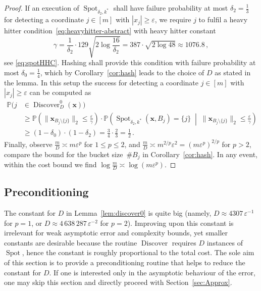 \documentclass[12pt]{article}
\theoremstyle{plain}
\theoremstyle{definition}
\renewcommand{\P}{{\mathbb P}}
\newcommand{\eps}{\varepsilon}
\renewcommand{\vec}{\boldsymbol}
\DeclareMathOperator{\spot}{Spot}
\DeclareMathOperator{\discover}{Discover} %
\begin{document}
\begin{proof}
    If an execution of $\spot_{\delta_2,k^\ast}$ 
    shall have failure probability at most $\delta_2 = \frac{1}{3}$ 
    for detecting a coordinate $j \in [m]$ with $|x_j| \geq \eps$,
    we require $j$ to fulfil a heavy hitter condition~\eqref{eq:heavyhitter-abstract}
    with heavy hitter constant
    \begin{equation*}
        \gamma = \frac{1}{\delta_2} \cdot 129 \sqrt{2 \log\frac{16}{\delta_2}}
            = 387 \cdot \sqrt{2 \log 48} \approx 1076.8 \,,
    \end{equation*}
    see \eqref{eq:spotHHC}.
    Hashing shall provide this condition with failure probability at most \mbox{$\delta_0 = \frac{1}{4}$},
    which by Corollary~\ref{cor:hash} leads to the choice of $D$ as stated in the lemma.
    In this setup the success for detecting a coordinate $j \in [m]$ with $|x_j| \geq \eps$
    can be computed as
    \begin{align*}
        \P\bigl(j &\in \discover_D^0(\vec{x})\bigr) \\
            &\geq \P\left( \|\vec{x}_{B_j \setminus \{j\}}\|_2 \leq \frac{\eps}{\gamma}\right)
                \cdot \P\left( \spot_{\delta_2,k^\ast}(\vec{x},B_j) = \{j\} \;\middle|\; \|\vec{x}_{B_j \setminus \{j\}}\|_2 \leq \frac{\eps}{\gamma}\right) \\
            &\geq (1-\delta_0) \cdot (1-\delta_2) = \frac{3}{4} \cdot \frac{2}{3} = \frac{1}{2} \,.
    \end{align*}
    Finally, observe $\frac{m}{D} \asymp m \eps^p$ for $1 \leq p \leq 2$, and $\frac{m}{D} \asymp m^{2/p} \eps^2 = \left(m \eps^p\right)^{2/p}$ for $p > 2$,
    compare the bound for the bucket size~$\#B_j$ in Corollary~\ref{cor:hash}.
    In any event, within
    the cost bound we find $\log \frac{m}{D} \asymp \log (m\eps^p)$.
\end{proof}


\subsection{Preconditioning}
\label{sec:precond}

The constant for $D$ in Lemma~\ref{lem:discover0} is quite big
(namely, $D \approx 4307\, \eps^{-1}$ for $p=1$, or $D \approx 4\,638\,287 \, \eps^{-2}$ for $p=2$).
Improving upon this constant is irrelevant for weak asymptotic error and complexity bounds, yet smaller constants are desirable because the routine $\discover$ requires $D$ instances of $\spot$, hence the constant is roughly proportional to the total cost.
The sole aim of this section is to provide a preconditioning routine that helps to reduce the constant for $D$.
If one is interested only in the asymptotic behaviour
of the error,
one may skip this section and directly proceed with Section~\ref{sec:Approx}.
\end{document}

